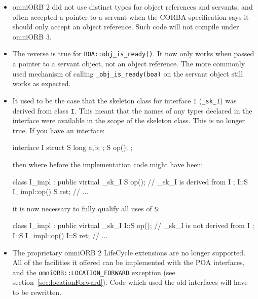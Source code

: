\documentclass[11pt,twoside,a4paper]{book}
\newcommand{\type}[1]{\texttt{#1}}
\newcommand{\intf}[1]{\texttt{#1}}
\newcommand{\code}[1]{\texttt{#1}}
\newcommand{\op}[1]{\texttt{#1()}}
\begin{document}
\begin{itemize}

\item omniORB 2 did not use distinct types for object references and
servants, and often accepted a pointer to a servant when the CORBA
specification says it should only accept an object reference. Such
code will not compile under omniORB 3.

\item The reverse is true for \op{BOA::obj\_is\_ready}. It now only
works when passed a pointer to a servant object, not an object
reference. The more commonly used mechanism of calling
\code{\_obj\_is\_ready(boa)} on the servant object still works as
expected.

\item It used to be the case that the skeleton class for interface
\intf{I} (\type{\_sk\_I}) was derived from class \type{I}. This meant
that the names of any types declared in the interface were available
in the scope of the skeleton class. This is no longer true. If you
have an interface:

\begin{idllisting}
interface I {
  struct S {
    long a,b;
  };
  S op();
};
\end{idllisting}

\noindent then where before the implementation code might have been:

\begin{cxxlisting}
class I_impl : public virtual _sk_I {
  S op();  // _sk_I is derived from I
};
I::S I_impl::op() {
  S ret;
  // ...
}
\end{cxxlisting}

\noindent it is now necessary to fully qualify all uses of \type{S}:

\begin{cxxlisting}
class I_impl : public virtual _sk_I {
  I::S op(); // _sk_I is not derived from I
};
I::S I_impl::op() {
  I::S ret;
  // ...
}
\end{cxxlisting}


\item The proprietary omniORB 2 LifeCycle extensions are no longer
supported. All of the facilities it offered can be implemented with
the POA interfaces, and the \code{omniORB::LOCATION\_FORWARD}
exception (see section~\ref{sec:locationForward}). Code which used the
old interfaces will have to be rewritten.


\end{itemize}
\end{document}
